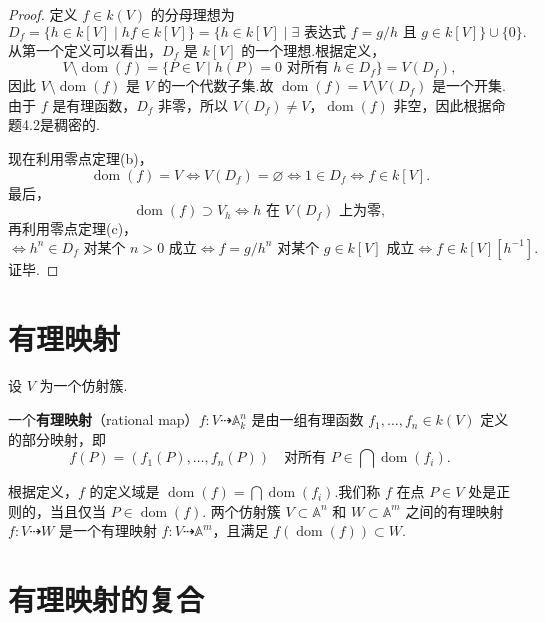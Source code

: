 \begin{proof}
定义 \(f \in  k(V)\) 的分母理想为
\[
{D}_{f} = \{ h \in  k[V] \mid  hf \in  k[V] \} = \{ h \in  k[V] \mid  \exists \text{ 表达式 } f = g/h \text{ 且 } g \in  k[V] \} \cup  \{ 0\}.
\]
从第一个定义可以看出，\({D}_{f}\) 是 \(k[V]\) 的一个理想.根据定义，
\[
V \setminus  \operatorname{dom}(f) = \{ P \in  V \mid  h(P) = 0 \text{ 对所有 } h \in  {D}_{f} \} = V({D}_{f}),
\]
因此 \(V \setminus  \operatorname{dom}(f)\) 是 \(V\) 的一个代数子集.故 \(\operatorname{dom}(f) = V \setminus  V({D}_{f})\) 是一个开集.由于 \(f\) 是有理函数，\(D_f\) 非零，所以 \(V(D_f) \neq V\)，\(\operatorname{dom}(f)\) 非空，因此根据命题4.2是稠密的.

现在利用零点定理(b)，
\[
\operatorname{dom}(f) = V \Leftrightarrow  V({D}_{f}) = \varnothing  \Leftrightarrow  1 \in  {D}_{f} \Leftrightarrow f \in  k[V].
\]
最后，
\[
\operatorname{dom}(f) \supset  {V}_{h} \Leftrightarrow  h \text{ 在 } V({D}_{f}) \text{ 上为零},
\]
再利用零点定理(c)，
\[
\Leftrightarrow  {h}^{n} \in  {D}_{f} \text{ 对某个 } n>0 \text{ 成立} \Leftrightarrow f = g/{h}^{n} \text{ 对某个 } g \in k[V] \text{ 成立} \Leftrightarrow f \in  k[V][h^{-1}].
\]
证毕.
\end{proof}

\section{有理映射}

设 \(V\) 为一个仿射簇.

\begin{definition}
一个\textbf{有理映射}（rational map）\(f : V \dashrightarrow {\mathbb{A}}_{k}^{n}\) 是由一组有理函数 \({f}_{1},\ldots ,{f}_{n} \in k(V)\) 定义的部分映射，即
\[
f(P) = (f_1(P), \ldots, f_n(P)) \quad \text{对所有 } P \in  \bigcap \operatorname{dom}(f_i).
\]
\end{definition}
根据定义，\(f\) 的定义域是 \(\operatorname{dom}(f) = \bigcap \operatorname{dom}(f_i)\).我们称 \(f\) 在点 \(P \in  V\) 处是正则的，当且仅当 \(P \in  \operatorname{dom}(f)\).
两个仿射簇 \(V \subset  {\mathbb{A}}^{n}\) 和 \(W \subset  {\mathbb{A}}^{m}\) 之间的有理映射 \(f : V \dashrightarrow W\) 是一个有理映射 \(f : V \dashrightarrow {\mathbb{A}}^{m}\)，且满足 \(f(\operatorname{dom}(f)) \subset  W\).

\section{有理映射的复合}

